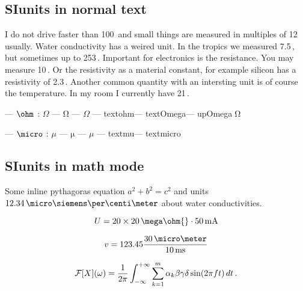 \subsection{SIunits in normal text}

I do not drive faster than 100\,\kilo\meter\per\hour{} and small
things are measured in multiples of 12\,\micro\meter{} usually. Water
conductivity has a weired unit. In the tropics we measured
7.5\,\micro\siemens\per\centi\meter, but sometimes up to
253\,\micro\siemens\per\centi\meter. Important for electronics is the
resistance. You may measure 10\,\kilo\ohm. Or the resistivity as a
material constant, for example silicon has a resistivity of
2.3\,\kilo\ohm\meter. Another common quantity with an intersting unit
is of course the temperature. In my room I currently have
21\,\celsius.

\ohm{} --- $\ohm$ : $\Omega$ --- $\mathrm{\Omega}$ --- $\mathsf{\Omega}$ ---
\ifcsname textohm\endcsname\textohm\fi  --- \ifcsname textOmega\endcsname\textOmega\fi ---
\ifcsname upOmega\endcsname$\upOmega$\fi 

\micro{} --- $\micro$ : $\mu$ --- $\mathrm{\mu}$ --- $\mathsf{\mu}$ ---
\ifcsname textmu\endcsname\textmu\fi --- \ifcsname textmicro\endcsname\textmicro\fi

\subsection{SIunits in math mode}

Some inline pythagoras equation $a^2 + b^2 = c^2$ and units
$12.34\,\micro\siemens\per\centi\meter$ about water
conductivities.

\[ U = 20 \times 20\,\mega\ohm{}\cdot 50\,\text{mA} \]

\[ v = 123.45 \frac{30\,\micro\meter}{10\,\text{ms}} \]

\[ {\cal F}[X](\omega) = \frac{1}{2\pi}\int_{-\infty}^{+\infty} \sum_{k=1}^m \alpha_k\beta\gamma\delta\sin(2\pi f t)\,dt\,. \]
